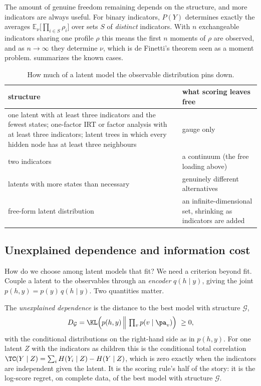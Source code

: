 \begin{draftblock}
The amount of genuine freedom remaining depends on the structure, and more indicators are always useful. For binary indicators, $P(Y)$ determines exactly the averages $\mathbb E_\nu\big[\prod_{i\in S}\rho_i\big]$ over sets $S$ of \emph{distinct} indicators. With $n$ exchangeable indicators sharing one profile $\rho$ this means the first $n$ moments of $\rho$ are observed, and as $n\to\infty$ they determine $\nu$, which is de Finetti's theorem \citep{definettiPrevisionSesLois1937} seen as a moment problem.  summarizes the known cases.

\begin{table}[ht]
\centering\small
\begin{tabular}{@{}p{}p{}@{}}
\toprule
structure & what scoring leaves free \\
\midrule
one latent with at least three indicators and the fewest states; one-factor IRT or factor analysis with at least three indicators; latent trees in which every hidden node has at least three neighbours & gauge only \citep{kruskalThreewayArraysRank1977,allmanIdentifiabilityParametersLatent2009} \\
two indicators & a continuum (the free loading above) \\
latents with more states than necessary & genuinely different alternatives \\
free-form latent distribution & an infinite-dimensional set, shrinking as indicators are added \\
\bottomrule
\end{tabular}
\caption{How much of a latent model the observable distribution pins down.}\label{arb:tab:freedom}
\end{table}

\subsection{Unexplained dependence and information cost}

How do we choose among latent models that fit? We need a criterion beyond fit. Couple a latent to the observables through an \emph{encoder} $q(h\mid y)$, giving the joint $p(h,y)=p(y)\,q(h\mid y)$. Two quantities matter.

The \emph{unexplained dependence} is the distance to the best model with structure $\mathcal G$,
\[
D_{\mathcal G}=\KL\Big(p(h,y)\,\Big\|\,\textstyle\prod_vp(v\mid\pa_v)\Big)\ \ge0,
\]
with the conditional distributions on the right-hand side as in $p(h,y)$. For one latent $Z$ with the indicators as children this is the conditional total correlation $\TC(Y\mid Z)=\sum_iH(Y_i\mid Z)-H(Y\mid Z)$, which is zero exactly when the indicators are independent given the latent. It is the scoring rule's half of the story: it is the log-score regret, on complete data, of the best model with structure $\mathcal G$.


\end{draftblock}
